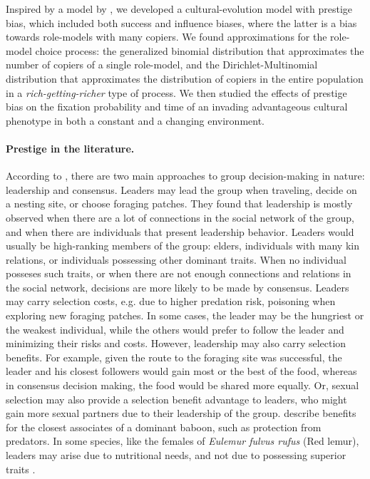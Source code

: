 \documentclass[12pt]{extarticle}
\begin{document}
Inspired by a model by \citet{evolutionBook}, we developed a cultural-evolution model with prestige bias, which included both success and influence biases, where the latter is a bias towards role-models with many copiers. We found approximations for the role-model choice process: the generalized binomial distribution that approximates the number of copiers of a single role-model, and the Dirichlet-Multinomial distribution that approximates the distribution of copiers in the entire population in a \textit{rich-getting-richer} type of process. 
We then studied the effects of prestige bias on the fixation probability and time of an invading advantageous cultural phenotype in both a constant and a changing environment.

\paragraph{Prestige in the literature.}

According to \citet{animal_leadership}, there are two main approaches to group decision-making in nature: leadership and consensus.
Leaders may lead the group when traveling, decide on a nesting site, or choose foraging patches. They found that leadership is mostly observed when there are a lot of connections in the social network of the group, and when there are individuals that present leadership behavior.
Leaders would usually be high-ranking members of the group: elders, individuals with many kin relations, or individuals possessing other dominant traits.
When no individual posseses such traits, or when there are not enough connections and relations in the social network, decisions are more likely to be made by consensus.
Leaders may carry selection costs, e.g. due to higher predation risk, poisoning when exploring new foraging patches.
In some cases, the leader may be the hungriest or the weakest individual, while the others would prefer to follow the leader and minimizing their risks and costs.
However, leadership may also carry selection benefits. For example, given the route to the foraging site was successful, the leader and his closest followers would gain most or the best of the food, whereas in consensus decision making, the food would be shared more equally. Or, sexual selection may also provide a selection benefit advantage to leaders, who might gain more sexual partners due to their leadership of the group. \citet{animal_leadership} describe benefits for the closest associates of a dominant baboon, such as protection from predators. 
In some species, like the females of \textit{Eulemur fulvus rufus} (Red lemur), leaders may arise due to nutritional needs, and not due to possessing superior traits \citep{lemurs}.
\end{document}
